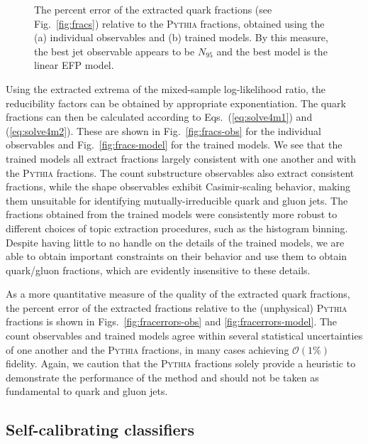 \documentclass[letterpaper,11pt]{article}
\DeclareRobustCommand{\Fig}[1]{Fig.~\ref{#1}}
\DeclareRobustCommand{\Figs}[2]{Figs.~\ref{#1} and \ref{#2}}
\DeclareRobustCommand{\Eqs}[2]{Eqs.~(\ref{#1}) and (\ref{#2})}
\newcommand{\pythia}{\textsc{Pythia}\xspace}
\begin{document}
\begin{figure}[t]
\centering
{}
\caption{
%
The percent error of the extracted quark fractions (see \Fig{fig:fracs}) relative to the \pythia fractions, obtained using the (a) individual observables and (b) trained models.
%
By this measure, the best jet observable appears to be $N_{95}$ and the best model is the linear EFP model.
}
\label{fig:fracerrors}
\end{figure}


Using the extracted extrema of the mixed-sample log-likelihood ratio, the reducibility factors can be obtained by appropriate exponentiation.
%
The quark fractions can then be calculated according to \Eqs{eq:solve4m1}{eq:solve4m2}.
%
These are shown in \Fig{fig:fracs-obs} for the individual observables and \Fig{fig:fracs-model} for the trained models.
%
We see that the trained models all extract fractions largely consistent with one another and with the \pythia fractions.
%
The count substructure observables also extract consistent fractions, while the shape observables exhibit Casimir-scaling behavior, making them unsuitable for identifying mutually-irreducible quark and gluon jets. 
%
The fractions obtained from the trained models were consistently more robust to different choices of topic extraction procedures, such as the histogram binning.
%
Despite having little to no handle on the details of the trained models, we are able to obtain important constraints on their behavior and use them to obtain quark/gluon fractions, which are evidently insensitive to these details.


As a more quantitative measure of the quality of the extracted quark fractions, the percent error of the extracted fractions relative to the (unphysical) \pythia fractions is shown in \Figs{fig:fracerrors-obs}{fig:fracerrors-model}.
%
The count observables and trained models agree within several statistical uncertainties of one another and the \pythia fractions, in many cases achieving $\mathcal O(1\%)$ fidelity.
%
Again, we caution that the \pythia fractions solely provide a heuristic to demonstrate the performance of the method and should not be taken as fundamental to quark and gluon jets.


\subsection{Self-calibrating classifiers}
\label{sec:selfcal}
\end{document}
